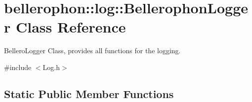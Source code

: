 \hypertarget{classbellerophon_1_1log_1_1BellerophonLogger}{}\section{bellerophon\+:\+:log\+:\+:Bellerophon\+Logger Class Reference}
\label{classbellerophon_1_1log_1_1BellerophonLogger}


Bellero\+Logger Class, provides all functions for the logging.  




{\ttfamily \#include $<$Log.\+h$>$}

\subsection*{Static Public Member Functions}
